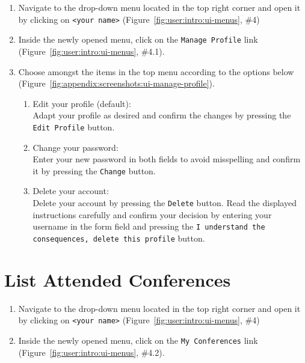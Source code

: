 \documentclass[nochapterpage,nopartpage,noheadingspace,numbersubsubsec,bigchapter,colorback,accentcolor=tud9c,10pt]{tudreport}
\begin{document}
        \begin{enumerate}
            \setlength\itemsep{0em}
            \item Navigate to the drop-down menu located in the top right corner and open it by clicking on \texttt{<your name>} (Figure~\ref{fig:user:intro:ui-menus}, \#4)
            \item Inside the newly opened menu, click on the \texttt{Manage Profile} link (Figure~\ref{fig:user:intro:ui-menus}, \#4.1).
            \item Choose amongst the items in the top menu according to the options below (Figure~\ref{fig:appendix:screenshots:ui-manage-profile}).
            \begin{enumerate}
                \item Edit your profile (default):\\
                Adapt your profile as desired and confirm the changes by pressing the \texttt{Edit Profile} button.
                \item Change your password:\\
                Enter your new password in both fields to avoid misspelling and confirm it by pressing the \texttt{Change} button.
                \item Delete your account:\\
                Delete your account by pressing the \texttt{Delete} button. Read the displayed instructions carefully and confirm your decision by entering your username in the form field and pressing the \texttt{I understand the consequences, delete this profile} button.
            \end{enumerate}
        \end{enumerate}

  \section{List Attended Conferences}
  \label{ch:user:user:list-conferences}

        \begin{enumerate}
            \setlength\itemsep{0em}
            \item Navigate to the drop-down menu located in the top right corner and open it by clicking on \texttt{<your name>} (Figure~\ref{fig:user:intro:ui-menus}, \#4)
            \item Inside the newly opened menu, click on the \texttt{My Conferences} link (Figure~\ref{fig:user:intro:ui-menus}, \#4.2).
        \end{enumerate}
\end{document}

